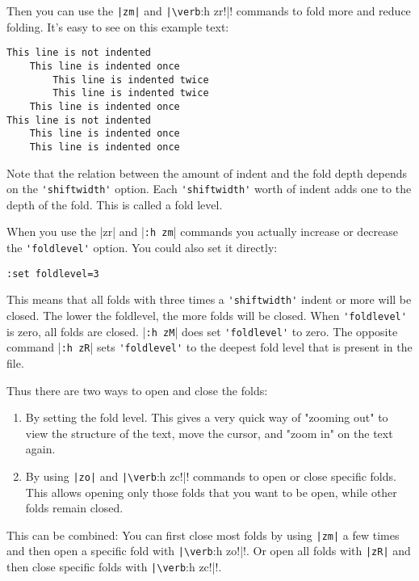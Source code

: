 Then you can use the \verb!|zm|! and \verb!|\verb!:h zr!|! commands to fold more and reduce folding.
It's easy to see on this example text:

\begin{Verbatim}[samepage=true]
This line is not indented
    This line is indented once
        This line is indented twice
        This line is indented twice
    This line is indented once
This line is not indented
    This line is indented once
    This line is indented once
\end{Verbatim}

Note that the relation between the amount of indent and the fold depth depends on the \verb!'shiftwidth'! option.
Each \verb!'shiftwidth'! worth of indent adds one to the depth of the fold.
This is called a fold level.

When you use the |zr| and |\verb!:h zm!| commands you actually increase or decrease the \verb!'foldlevel'! option.
You could also set it directly:

\begin{Verbatim}[samepage=true]
 :set foldlevel=3
\end{Verbatim}

This means that all folds with three times a \verb!'shiftwidth'! indent or more will be closed.
The lower the foldlevel, the more folds will be closed.
When \verb!'foldlevel'! is zero, all folds are closed.
|\verb!:h zM!| does set \verb!'foldlevel'! to zero.
The opposite command |\verb!:h zR!| sets \verb!'foldlevel'! to the deepest fold level that is present in the file.

Thus there are two ways to open and close the folds:
\begin{enumerate}
\item By setting the fold level.
This gives a very quick way of "zooming out" to view the structure of the text, move the cursor, and "zoom in" on the text again.

\item By using \verb!|zo|! and \verb!|\verb!:h zc!|! commands to open or close specific folds.
This allows opening only those folds that you want to be open, while other folds remain closed.
\end{enumerate}

This can be combined: You can first close most folds by using \verb!|zm|! a few times and then open a specific fold with \verb!|\verb!:h zo!|!.
Or open all folds with \verb!|zR|! and then close specific folds with \verb!|\verb!:h zc!|!.

